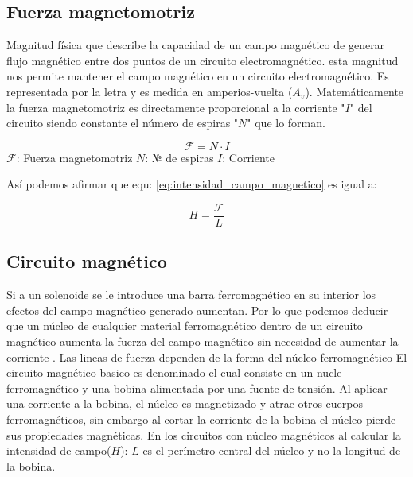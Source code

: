 \documentclass{report}
\begin{document}
  \subsection{Fuerza magnetomotriz }\label{ssec:fuerza_magnetomotriz}
Magnitud física que describe la capacidad de un campo magnético de generar flujo magnético entre dos puntos de un circuito electromagnético.
esta magnitud nos permite mantener el campo magnético en un circuito electromagnético. Es representada por la letra 
y es medida en amperios-vuelta (\( A_v \)). 
\fspace{2em}
Matemáticamente la fuerza magnetomotriz es directamente proporcional a la corriente "\(I\)" del circuito siendo constante 
el número de espiras "\(N\)" que lo forman.
  \begin{center}\[
  \mathcal{F} = N \cdot I
\]\label{eq:fuerza_magnetomotriz}
  \(\mathcal{F}\): Fuerza magnetomotriz \hspace{1.5cm} \(N\): № de espiras \hspace{1.5cm} \(I\): Corriente
  
  \end{center}
\vspace{1.5em}
Así podemos afirmar que equ: \ref{eq:intensidad_campo_magnetico} es igual a:
\begin{center}
  \[
    H = \frac{\mathcal{F}}{L}
  \]
\end{center}
  \subsection{Circuito magnético }\label{ssec:circuito_magnético}
Si a un solenoide se le introduce una barra ferromagnético en su interior 
los efectos del campo magnético generado aumentan. Por lo que podemos deducir 
que un núcleo de cualquier material ferromagnético dentro de un circuito magnético aumenta la fuerza del campo magnético
sin necesidad de aumentar la corriente . Las lineas de fuerza dependen de la forma del núcleo ferromagnético
\vspace{1.5em}\newline
El circuito magnético basico es denominado  el cual consiste en un nucle ferromagnético y 
una bobina alimentada por una fuente de tensión. Al aplicar una corriente a la bobina, el núcleo es magnetizado
y atrae otros cuerpos ferromagnéticos, sin embargo al cortar la corriente de la bobina el núcleo pierde sus propiedades
magnéticas. 
\vspace{1.5em}\newline
En los circuitos con núcleo magnéticos al calcular la intensidad de campo(\(H\)): \(L\) es el perímetro central del núcleo y no 
la longitud de la bobina.
\newpage
\end{document}
